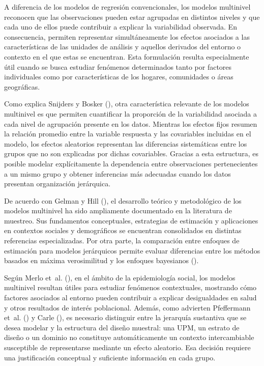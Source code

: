 \documentclass[
  spanish,
  11pt,
  letterpaper,
  oneside,
  open=any]{scrbook}
\begin{document}
A diferencia de los modelos de regresión convencionales, los modelos
multinivel reconocen que las observaciones pueden estar agrupadas en
distintos niveles y que cada uno de ellos puede contribuir a explicar la
variabilidad observada. En consecuencia, permiten representar
simultáneamente los efectos asociados a las características de las
unidades de análisis y aquellos derivados del entorno o contexto en el
que estas se encuentran. Esta formulación resulta especialmente útil
cuando se busca estudiar fenómenos determinados tanto por factores
individuales como por características de los hogares, comunidades o
áreas geográficas.

Como explica Snijders y Bosker (), otra
característica relevante de los modelos multinivel es que permiten
cuantificar la proporción de la variabilidad asociada a cada nivel de
agrupación presente en los datos. Mientras los efectos fijos resumen la
relación promedio entre la variable respuesta y las covariables
incluidas en el modelo, los efectos aleatorios representan las
diferencias sistemáticas entre los grupos que no son explicadas por
dichas covariables. Gracias a esta estructura, es posible modelar
explícitamente la dependencia entre observaciones pertenecientes a un
mismo grupo y obtener inferencias más adecuadas cuando los datos
presentan organización jerárquica.

De acuerdo con Gelman y Hill (), el
desarrollo teórico y metodológico de los modelos multinivel ha sido
ampliamente documentado en la literatura de muestreo. Sus fundamentos
conceptuales, estrategias de estimación y aplicaciones en contextos
sociales y demográficos se encuentran consolidados en distintas
referencias especializadas. Por otra parte, la comparación entre
enfoques de estimación para modelos jerárquicos permite evaluar
diferencias entre los métodos basados en máxima verosimilitud y los
enfoques bayesianos ().

Según Merlo et~al. (), en el ámbito
de la epidemiología social, los modelos multinivel resultan útiles para
estudiar fenómenos contextuales, mostrando cómo factores asociados al
entorno pueden contribuir a explicar desigualdades en salud y otros
resultados de interés poblacional. Además, como advierten Pfeffermann
et~al. () y Carle
(), es necesario distinguir entre la
jerarquía sustantiva que se desea modelar y la estructura del diseño
muestral: una UPM, un estrato de diseño o un dominio no constituye
automáticamente un contexto intercambiable susceptible de representarse
mediante un efecto aleatorio. Esa decisión requiere una justificación
conceptual y suficiente información en cada grupo.
\end{document}

